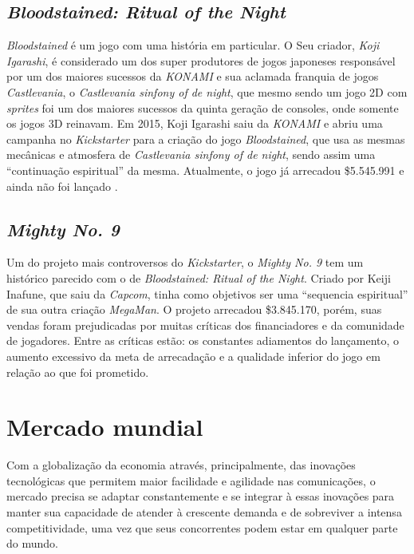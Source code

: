 \documentclass{classe_cn}                 %
\begin{document}
\subsection{\textit{Bloodstained: Ritual of the Night}}

\textit{Bloodstained} é um jogo com uma história em particular. O Seu criador, \textit{Koji Igarashi}, é considerado um dos super produtores de jogos japoneses responsável por um dos maiores sucessos da \textit{KONAMI} e sua aclamada franquia de jogos \textit{Castlevania}, o \textit{Castlevania sinfony of de night}, que mesmo sendo um jogo 2D com \textit{sprites} foi um dos maiores sucessos da quinta geração de consoles, onde somente os jogos 3D reinavam. Em 2015, Koji Igarashi saiu da \textit{KONAMI} e abriu uma campanha no \textit{Kickstarter} para a criação do jogo \textit{Bloodstained}, que usa as mesmas mecânicas e atmosfera de \textit{Castlevania sinfony of de night}, sendo assim uma “continuação espiritual” da mesma. Atualmente, o jogo já arrecadou \$5.545.991 e ainda não foi lançado \cite{ JOVEMNERD:2017}.

\subsection{\textit{Mighty No. 9}}

Um do projeto mais controversos do \textit{Kickstarter}, o \textit{Mighty No. 9} tem um histórico parecido com o de \textit{Bloodstained: Ritual of the Night}. Criado por Keiji Inafune, que saiu da \textit{Capcom}, tinha como objetivos ser uma “sequencia espiritual” de sua outra criação \textit{MegaMan}. O projeto arrecadou \$3.845.170, porém, suas vendas foram prejudicadas por muitas críticas dos financiadores e da comunidade de jogadores. Entre as críticas estão: os constantes adiamentos do lançamento, o aumento excessivo da meta de arrecadação e a qualidade inferior do jogo em relação ao que foi prometido.

\section{Mercado mundial}

Com a globalização da economia através, principalmente, das inovações tecnológicas que permitem maior facilidade e agilidade nas comunicações, o mercado precisa se adaptar constantemente e se integrar à essas inovações para manter sua capacidade de atender à crescente demanda e de sobreviver a intensa competitividade, uma vez que seus concorrentes podem estar em qualquer parte do mundo.
\end{document}
